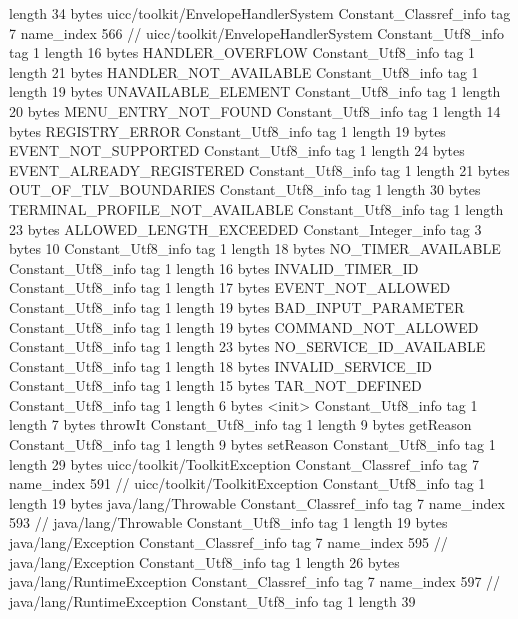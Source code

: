{{{			length	34
			bytes	uicc/toolkit/EnvelopeHandlerSystem
		}
		Constant_Classref_info {
			tag	7
			name_index	566		// uicc/toolkit/EnvelopeHandlerSystem
		}
		Constant_Utf8_info {
			tag	1
			length	16
			bytes	HANDLER_OVERFLOW
		}
		Constant_Utf8_info {
			tag	1
			length	21
			bytes	HANDLER_NOT_AVAILABLE
		}
		Constant_Utf8_info {
			tag	1
			length	19
			bytes	UNAVAILABLE_ELEMENT
		}
		Constant_Utf8_info {
			tag	1
			length	20
			bytes	MENU_ENTRY_NOT_FOUND
		}
		Constant_Utf8_info {
			tag	1
			length	14
			bytes	REGISTRY_ERROR
		}
		Constant_Utf8_info {
			tag	1
			length	19
			bytes	EVENT_NOT_SUPPORTED
		}
		Constant_Utf8_info {
			tag	1
			length	24
			bytes	EVENT_ALREADY_REGISTERED
		}
		Constant_Utf8_info {
			tag	1
			length	21
			bytes	OUT_OF_TLV_BOUNDARIES
		}
		Constant_Utf8_info {
			tag	1
			length	30
			bytes	TERMINAL_PROFILE_NOT_AVAILABLE
		}
		Constant_Utf8_info {
			tag	1
			length	23
			bytes	ALLOWED_LENGTH_EXCEEDED
		}
		Constant_Integer_info {
			tag	3
			bytes	10
		}
		Constant_Utf8_info {
			tag	1
			length	18
			bytes	NO_TIMER_AVAILABLE
		}
		Constant_Utf8_info {
			tag	1
			length	16
			bytes	INVALID_TIMER_ID
		}
		Constant_Utf8_info {
			tag	1
			length	17
			bytes	EVENT_NOT_ALLOWED
		}
		Constant_Utf8_info {
			tag	1
			length	19
			bytes	BAD_INPUT_PARAMETER
		}
		Constant_Utf8_info {
			tag	1
			length	19
			bytes	COMMAND_NOT_ALLOWED
		}
		Constant_Utf8_info {
			tag	1
			length	23
			bytes	NO_SERVICE_ID_AVAILABLE
		}
		Constant_Utf8_info {
			tag	1
			length	18
			bytes	INVALID_SERVICE_ID
		}
		Constant_Utf8_info {
			tag	1
			length	15
			bytes	TAR_NOT_DEFINED
		}
		Constant_Utf8_info {
			tag	1
			length	6
			bytes	<init>
		}
		Constant_Utf8_info {
			tag	1
			length	7
			bytes	throwIt
		}
		Constant_Utf8_info {
			tag	1
			length	9
			bytes	getReason
		}
		Constant_Utf8_info {
			tag	1
			length	9
			bytes	setReason
		}
		Constant_Utf8_info {
			tag	1
			length	29
			bytes	uicc/toolkit/ToolkitException
		}
		Constant_Classref_info {
			tag	7
			name_index	591		// uicc/toolkit/ToolkitException
		}
		Constant_Utf8_info {
			tag	1
			length	19
			bytes	java/lang/Throwable
		}
		Constant_Classref_info {
			tag	7
			name_index	593		// java/lang/Throwable
		}
		Constant_Utf8_info {
			tag	1
			length	19
			bytes	java/lang/Exception
		}
		Constant_Classref_info {
			tag	7
			name_index	595		// java/lang/Exception
		}
		Constant_Utf8_info {
			tag	1
			length	26
			bytes	java/lang/RuntimeException
		}
		Constant_Classref_info {
			tag	7
			name_index	597		// java/lang/RuntimeException
		}
		Constant_Utf8_info {
			tag	1
			length	39
}}}
